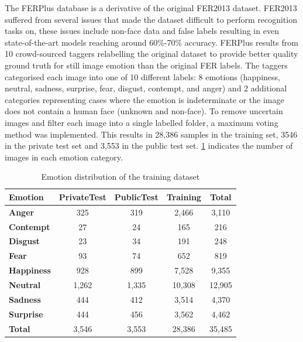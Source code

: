 The FERPlus database is a derivative of the original FER2013 dataset. FER2013 suffered from several issues that made the dataset difficult to perform recognition tasks on, these issues include non-face data and false labels resulting in even state-of-the-art models reaching around 60\%-70\% accuracy. FERPlus results from 10 crowd-sourced taggers relabelling the original dataset to provide better quality ground truth for still image emotion than the original FER labels. The taggers categorised each image into one of 10 different labels: 8 emotions (happiness, neutral, sadness, surprise, fear, disgust, contempt, and anger) and 2 additional categories representing cases where the emotion is indeterminate or the image does not contain a human face (unknown and non-face). To remove uncertain images and filter each image into a single labelled folder, a maximum voting method was implemented. This results in 28,386 samples in the training set, 3546 in the private test set and 3,553 in the public test set. \ref{tab:emotion_distribution} indicates the number of images in each emotion category.

\begin{table}[h!]
\centering{}
\caption{Emotion distribution of the training dataset}
\begin{tabular}{|l|c|c|c|c|}
\hline
\textbf{Emotion}   & \textbf{PrivateTest} & \textbf{PublicTest} & \textbf{Training} & \textbf{Total} \\ \hline
\textbf{Anger}     & 325                  & 319                 & 2,466             & 3,110          \\ \hline
\textbf{Contempt}  & 27                   & 24                  & 165               & 216            \\ \hline
\textbf{Disgust}   & 23                   & 34                  & 191               & 248            \\ \hline
\textbf{Fear}      & 93                   & 74                  & 652               & 819            \\ \hline
\textbf{Happiness} & 928                  & 899                 & 7,528             & 9,355          \\ \hline
\textbf{Neutral}   & 1,262                & 1,335               & 10,308            & 12,905         \\ \hline
\textbf{Sadness}   & 444                  & 412                 & 3,514             & 4,370          \\ \hline
\textbf{Surprise}  & 444                  & 456                 & 3,562             & 4,462          \\ \hline
\textbf{Total}     & 3,546                & 3,553               & 28,386            & 35,485         \\ \hline
\end{tabular}
\label{tab:emotion_distribution}
\end{table}

